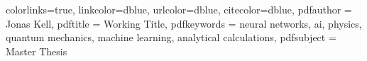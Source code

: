 \hypersetup
{
colorlinks=true,
linkcolor=dblue,                                    %
urlcolor=dblue,                                     %
citecolor=dblue,                                    %
pdfauthor = {Jonas Kell},                           %
pdftitle = {Working Title}, %
pdfkeywords = {neural networks, ai, physics, quantum mechanics, machine learning, analytical calculations},           
pdfsubject = {Master Thesis}                      
}


